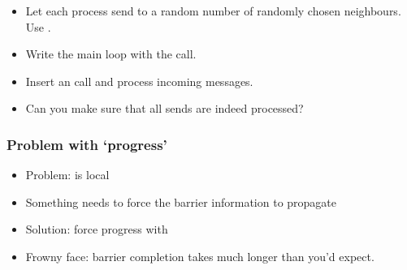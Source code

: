 \begin{mpithree}
\begin{exerciseframe}[ibarrierupdate]
  \begin{itemize}
  \item Let each process send to a random number of randomly chosen
    neighbours. Use .
  \item Write the main loop with the  call.
  \item Insert an  call and process incoming messages.
  \item Can you make sure that all sends are indeed processed?
  \end{itemize}
\end{exerciseframe}

\begin{frame}[containsverbatim]\frametitle{Problem with `progress'}
  \begin{itemize}
  \item Problem:  is local
  \item Something needs to force the barrier information to propagate
  \item Solution: force progress with 
  \item Frowny face: barrier completion takes much longer than you'd expect.
  \end{itemize}
\end{frame}
\end{mpithree}

\endinput

\begin{frame}[containsverbatim]\frametitle{}
\begin{lstlisting}
  
\end{lstlisting}
\end{frame}

